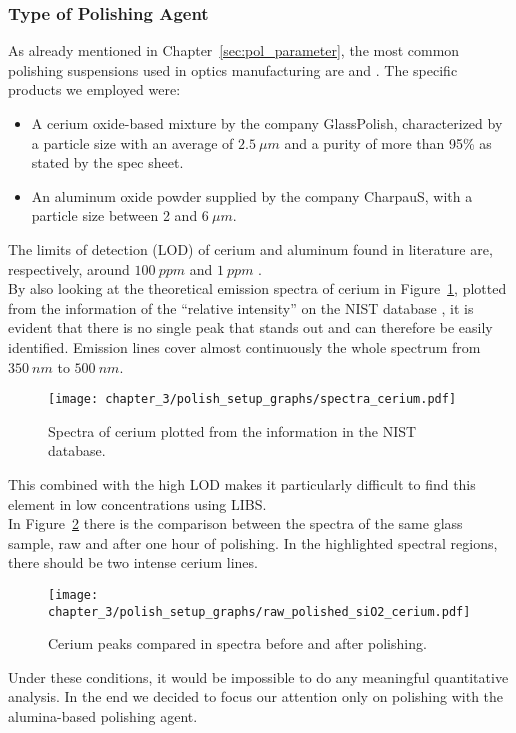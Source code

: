 \subsubsection{Type of Polishing Agent}
\label{subsubsec:polish_type_conc}
As already mentioned in Chapter~\ref{sec:pol_parameter}, the most common polishing suspensions used in optics manufacturing are  and . 
The specific products we employed were:

\begin{itemize}
    \item A cerium oxide-based mixture by the company GlassPolish, characterized by a particle size with an average of $2.5\: \mu m$ and a purity of more than 95\% as stated by the spec sheet.
    \item An aluminum oxide powder supplied by the company CharpauS, with a particle size between 2 and $6 \: \mu m$.
\end{itemize}

The limits of detection (LOD) of cerium and aluminum found in literature are, respectively, around $100 \: ppm$ \cite{martinExploringLaserinducedBreakdown2012} and $1\: ppm$ \cite{caceresQuantitativeAnalysisTrace2001}.
\\
By also looking at the theoretical emission spectra of cerium in Figure~\ref{fig:ce_plot_nist}, plotted from the information of the “relative intensity” on the NIST database \cite{NISTAtomicSpectra}, it is evident that there is no single peak that stands out and can therefore be easily identified. Emission lines cover almost continuously the whole spectrum from $350 \: nm$ to $500 \: nm$.
\begin{figure}[H]
    \centering
    \texttt{[image: chapter\_3/polish\_setup\_graphs/spectra\_cerium.pdf]} 
    \vspace*{-30pt}
    \caption{Spectra of cerium plotted from the information in the NIST database. }
    \label{fig:ce_plot_nist}
\end{figure}
This combined with the high LOD makes it particularly difficult to find this element in low concentrations using LIBS.
\\
In Figure~\ref{fig:ce_peaks_raw_polished} there is the comparison between the spectra of the same glass sample, raw and after one hour of polishing. In the highlighted spectral regions, there should be two intense cerium lines.
\begin{figure}[H]
    \centering
    \texttt{[image: chapter\_3/polish\_setup\_graphs/raw\_polished\_siO2\_cerium.pdf]} 
    \vspace*{-30pt}
    \caption{Cerium peaks compared in spectra before and after polishing. }
    \label{fig:ce_peaks_raw_polished}
\end{figure}
Under these conditions, it would be impossible to do any meaningful quantitative analysis. In the end we decided to focus our attention only on polishing with the alumina-based polishing agent.

